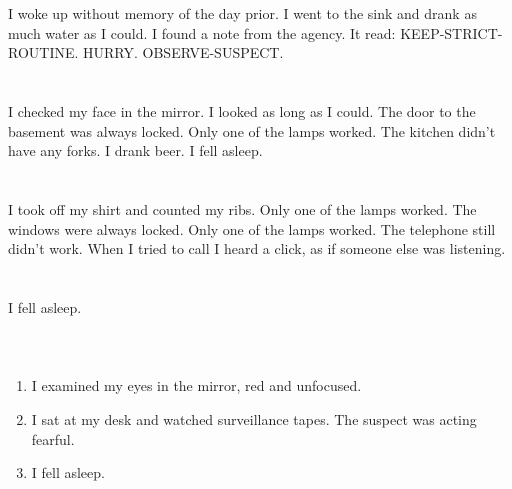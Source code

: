 \documentclass{article}
\begin{document}
    \section{}
    I woke up without memory of the day prior. I went to the sink and drank as much water as I could. I found a note from the agency. It read: KEEP-STRICT-ROUTINE. HURRY. OBSERVE-SUSPECT.  
    \newpage
    
    \section{}
    I checked my face in the mirror. I looked as long as I could. The door to the basement was always locked. Only one of the lamps worked. The kitchen didn't have any forks. I drank beer. I fell asleep.  
    \newpage
    
    \section{}
    I took off my shirt and counted my ribs. Only one of the lamps worked. The windows were always locked. Only one of the lamps worked. The telephone still didn't work. When I tried to call I heard a click, as if someone else was listening.  
    \newpage
    
    \section{}
    I fell asleep.\\\\ 
    \newpage
    
    \section{}
    
    \begin{enumerate}
    
    \item I examined my eyes in the mirror, red and unfocused.\\
    
    \item I sat at my desk and watched surveillance tapes. The suspect was acting fearful.\\
    
    \item I fell asleep.\\
    
    \end{enumerate}
     
\end{document}
